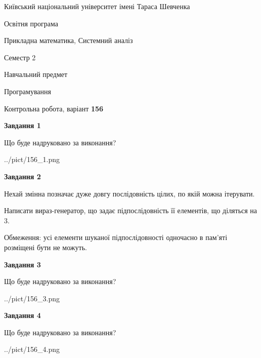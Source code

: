 \documentclass[12pt, ukrainian]{article}
\begin{document}
{{\begin {small}\par
{ \center  Київський національний університет імені Тараса Шевченка \par}
{\parbox {5 cm}{Освітня програма \hfill}{\parbox {8 cm}{Прикладна математика, Системний аналіз \hfill}}\parbox {5 cm}{\hfill Семестр 2}}\par
{\parbox {5 cm} {Навчальний предмет \hfill}\parbox {7 cm}{Програмування \hfill}\parbox {6cm}{\hfill}\par}\vspace{-7pt} \end{small}}{\center Контрольна робота, варіант  \No \textbf
{ 156 }\par}}
{
\begin {large}
{\begin {center}\textbf{Завдання 1}\end {center}}\par
Що буде надруковано за виконання?\par\par
\begin{center}
	{../pict/156_1.png}
\end{center}
\newpage

{\begin {center}\textbf{Завдання 2}\end {center}}\par
Нехай змінна  позначає дуже довгу послідовність цілих, по якій можна ітерувати.

Написати вираз-генератор, що задає підпослідовність її елементів, що діляться на 3.

Обмеження: усі елементи шуканої підпослідовності одночасно в пам'яті розміщені бути не можуть.\par
\newpage

{\begin {center}\textbf{Завдання 3}\end {center}}\par
Що буде надруковано за виконання?
\begin{center}
	{../pict/156_3.png}
\end{center}
\newpage

{\begin {center}\textbf{Завдання 4}\end {center}}\par
Що буде надруковано за виконання?\par
\begin{center}
	{../pict/156_4.png}
\end{center}
\newpage


\end{large}}
\end{document}

